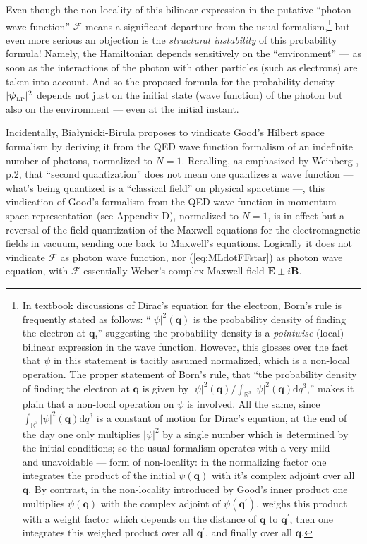 \documentclass[12pt]{article}
\theoremstyle{definition}
\newcommand{\drm}{\mathrm{d}}
\newcommand{\refeq}[1]{(\ref{#1})}
\newcommand{\vect}[1] {\boldsymbol{{ #1}} }
\newcommand{\qV}{{\vect{q}}}            %
\newcommand{\FV}{\pmb{\mathcal{F}}}
\numberwithin{equation}{section}
\newcommand{\bB}{\mathbf{B}}
\newcommand{\bE}{\mathbf{E}}
\newcommand{\psiLP}{{{\boldsymbol{\psi}}_{\mbox{\rm\tiny LP}}}}
\newcommand{\Rset}{{\mathbb R}}
\begin{document}
 Even though the non-locality of this bilinear expression in the putative ``photon wave function'' $\FV$ means a 
significant departure from the usual formalism,\footnote{In textbook discussions of Dirac's equation for the electron, Born's rule is frequently 
stated as follows: ``$|\psi|^2(\qV)$ is  the probability density of finding the electron at $\qV$,'' suggesting the probability density 
is a \emph{pointwise} (local)  bilinear expression in the wave function.
 However, this glosses over the fact that $\psi$ in this statement is tacitly assumed normalized, which is a non-local operation.
 The proper statement of Born's rule, that ``the probability density of finding the electron at $\qV$ is given by 
 $|\psi|^2(\qV)/\int_{\Rset^3}|\psi|^2(\qV)\drm{q}^3$,'' makes it plain that a non-local operation on $\psi$ is involved.
 All the same, since $\int_{\Rset^3}|\psi|^2(\qV)\drm{q}^3$ is a constant of motion for Dirac's equation, at the end of the day
one only multiplies $|\psi|^2$ by a single number which is determined by the initial conditions; so the usual formalism operates with
a very mild --- and unavoidable --- form of non-locality: in the normalizing factor one integrates the product of the initial $\psi(\qV)$ 
with it's complex adjoint over all $\qV$. 
 By contrast, in the non-locality introduced by Good's inner product one multiplies $\psi(\qV)$ with the complex
adjoint of $\psi({\qV}^\prime)$, weighs this product with a weight factor which depends on the distance of $\qV$ to ${\qV}^\prime$, 
then one integrates this weighed product over all ${\qV}^\prime$, and finally over all $\qV$.\vspace{-10pt}}
but even more serious an objection is the \emph{structural instability} of this probability formula!
 Namely, the Hamiltonian depends sensitively on the ``environment'' --- as soon as the interactions of the photon 
with other particles (such as electrons) are taken into account. 
 And so the proposed formula for the probability density $|\psiLP|^2$ depends 
not just on the initial state (wave function) of the photon but also on the environment --- even at the initial instant.

 Incidentally, Bia\l{}ynicki-Birula proposes to vindicate Good's Hilbert space formalism by deriving it from the QED wave function 
formalism of an indefinite number of photons, normalized to $N=1$. 
 Recalling, as emphasized by Weinberg \cite{WeinbergTALK}, p.2, that ``second quantization'' does
not mean one quantizes a wave function --- what's being quantized is a ``classical field'' on physical spacetime ---, 
this vindication of Good's formalism from the QED wave function in momentum space representation (see Appendix D), 
normalized to $N=1$, is in effect but a reversal of the field quantization of the Maxwell equations for the electromagnetic fields in vacuum, 
sending one back to Maxwell's equations.
 Logically it does not vindicate $\FV$ as photon wave function, nor \refeq{eq:MLdotFFstar} as photon wave equation, with $\FV$ essentially
Weber's complex Maxwell field $\bE\pm i\bB$.
\end{document}

